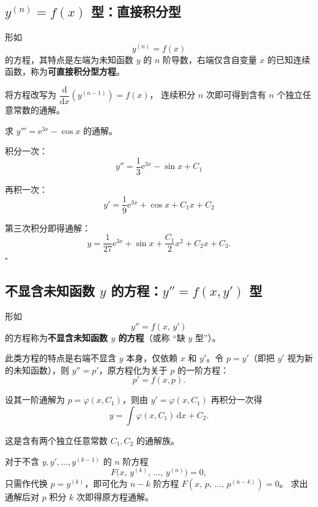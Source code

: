 \documentclass[lang=cn,11pt]{elegantbook}
\begin{document}
\subsection{$y^{(n)}=f(x)$ 型：直接积分型}

\begin{definition}[$y^{(n)}=f(x)$ 型方程]
形如
\[y^{(n)}=f(x)\]
的方程，其特点是左端为未知函数 $y$ 的 $n$ 阶导数，右端仅含自变量 $x$ 的已知连续函数，称为\textbf{可直接积分型方程}。
\end{definition}

将方程改写为 $\dfrac{\mathrm{d}}{\mathrm{d}x}\!\left(y^{(n-1)}\right)=f(x)$，
连续积分 $n$ 次即可得到含有 $n$ 个独立任意常数的通解。

\begin{exercise}[逐次积分]
求 $y'''=\mathrm{e}^{3x}-\cos x$ 的通解。
\end{exercise}
\begin{solution}
积分一次：
\[
y''=\dfrac13\mathrm{e}^{3x}-\sin x+C_1
\]

再积一次：
\[
y'=\dfrac19\mathrm{e}^{3x}+\cos x+C_1x+C_2
\]

第三次积分即得通解：
\[
\boxed{y=\frac{1}{27}\mathrm{e}^{3x}+\sin x+\frac{C_1}{2}x^{2}+C_2x+C_3}.
\]
\hfill$\square$
\end{solution}


\subsection{不显含未知函数 $y$ 的方程：$y''=f(x,y')$ 型}

\begin{definition} 
形如
\[y''=f(x,\,y')
\]
的方程称为\textbf{不显含未知函数 $y$ 的方程}（或称 ``缺 $y$ 型''）。
\end{definition}

此类方程的特点是右端不显含 $y$ 本身，仅依赖 $x$ 和 $y'$。令 $p=y'$（即把 $y'$ 视为新的未知函数），则 $y''=p'$，原方程化为关于 $p$ 的一阶方程：
\[
p'=f(x,p).
\]

设其一阶通解为 $p=\varphi(x,C_1)$，则由 $y'=\varphi(x,C_1)$ 再积分一次得
\[
y=\int\varphi(x,C_1)\,\mathrm{d}x+C_2.
\]

这是含有两个独立任意常数 $C_1,C_2$ 的通解族。

\begin{property}[一般化推广]
对于不含 $y, y', \dots, y^{(k-1)}$ 的 $n$ 阶方程
\[
F\bigl(x,\,y^{(k)},\,\dots,\,y^{(n)}\bigr)=0,
\]
只需作代换 $p=y^{(k)}$，即可化为 $n-k$ 阶方程
$F(x,\,p,\,\dots,\,p^{(n-k)})=0$。
求出通解后对 $p$ 积分 $k$ 次即得原方程通解。
\end{property}
\end{document}
